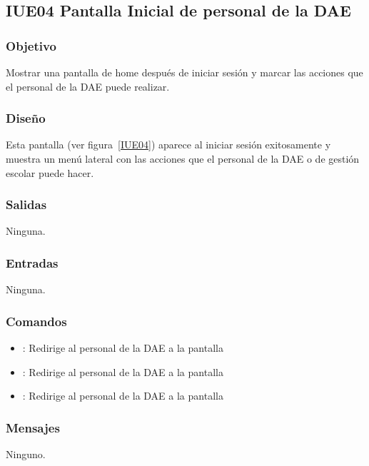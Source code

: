 \subsection{IUE04 Pantalla Inicial de personal de la DAE}

\subsubsection{Objetivo}
Mostrar una pantalla de home después de iniciar sesión y marcar las acciones que el personal de la DAE puede realizar.

\subsubsection{Diseño}
Esta pantalla  (ver figura~\ref{IUE04}) aparece al iniciar sesión exitosamente y muestra un menú lateral con las acciones que el personal de la DAE o de gestión escolar puede hacer. 


\subsubsection{Salidas}

Ninguna.

\subsubsection{Entradas}
Ninguna.

\subsubsection{Comandos}
\begin{itemize}
	\item {}: Redirige al personal de la DAE a la pantalla 
	\item {}: Redirige al personal de la DAE a la pantalla 
	\item {}: Redirige al personal de la DAE a la pantalla 	
\end{itemize}

\subsubsection{Mensajes}

\begin{Citemize}
	\item Ninguno.
\end{Citemize}

